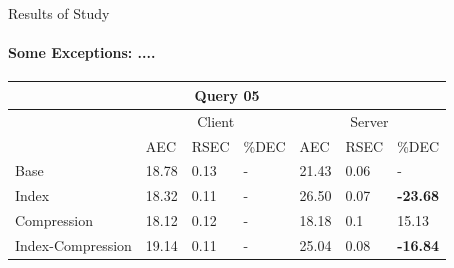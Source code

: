 \documentclass{beamer}
\begin{document}
\begin{frame}{Results of Study}
\framesubtitle{Some Exceptions: ....}

\scriptsize
\begin{table}[]
\begin{tabular}{|lllllll|}
\hline
\multicolumn{7}{|c|}{Query 05}                                                                                                                                                 \\ \hline
\multicolumn{1}{|l|}{}   & \multicolumn{3}{c|}{Client}                                                       & \multicolumn{3}{c|}{Server}                                     \\ \hline
\multicolumn{1}{|l|}{}   & \multicolumn{1}{l|}{AEC}   & \multicolumn{1}{l|}{RSEC} & \multicolumn{1}{l|}{\%DEC} & \multicolumn{1}{l|}{AEC}   & \multicolumn{1}{l|}{RSEC} & \%DEC    \\ \hline
\multicolumn{1}{|l|}{Base}  & \multicolumn{1}{l|}{18.78} & \multicolumn{1}{l|}{0.13} & \multicolumn{1}{l|}{-}   & \multicolumn{1}{l|}{21.43} & \multicolumn{1}{l|}{0.06} & -      \\ \hline
\multicolumn{1}{|l|}{Index}  & \multicolumn{1}{l|}{18.32} & \multicolumn{1}{l|}{0.11} & \multicolumn{1}{l|}{-}   & \multicolumn{1}{l|}{26.50} & \multicolumn{1}{l|}{0.07} & \textbf{-23.68} \\ \hline
\multicolumn{1}{|l|}{Compression}  & \multicolumn{1}{l|}{18.12} & \multicolumn{1}{l|}{0.12} & \multicolumn{1}{l|}{-}   & \multicolumn{1}{l|}{18.18} & \multicolumn{1}{l|}{0.1}  & 15.13  \\ \hline
\multicolumn{1}{|l|}{Index-Compression} & \multicolumn{1}{l|}{19.14} & \multicolumn{1}{l|}{0.11} & \multicolumn{1}{l|}{-}   & \multicolumn{1}{l|}{25.04} & \multicolumn{1}{l|}{0.08} & \textbf{-16.84} \\ \hline
\end{tabular}
\end{table}



\end{frame}
\end{document}
